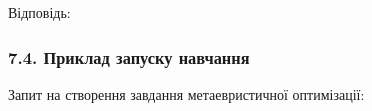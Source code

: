 \documentclass[12pt,a4paper]{article}
\begin{document}
Відповідь:



\begin{Shaded}

\begin{Highlighting}[]

\FunctionTok{\{}

    \FunctionTok{:} \FunctionTok{,}

    \FunctionTok{:} \FunctionTok{,}

    \FunctionTok{:} \FunctionTok{,}

    \FunctionTok{:} \FunctionTok{,}

    \FunctionTok{:} \FunctionTok{,}

    \FunctionTok{:} \FunctionTok{,}

    \FunctionTok{:} 

\FunctionTok{\}}

\end{Highlighting}

\end{Shaded}



\subsubsection{7.4. Приклад запуску навчання}\label{ux43fux440ux438ux43aux43bux430ux434-ux437ux430ux43fux443ux441ux43aux443-ux43dux430ux432ux447ux430ux43dux43dux44f}



Запит на створення завдання метаевристичної оптимізації:



\begin{Shaded}

\begin{Highlighting}[]

 

 



\FunctionTok{\{}

    \FunctionTok{:} \FunctionTok{,}

    \FunctionTok{:} 

\FunctionTok{\}}

\end{Highlighting}

\end{Shaded}
\end{document}
